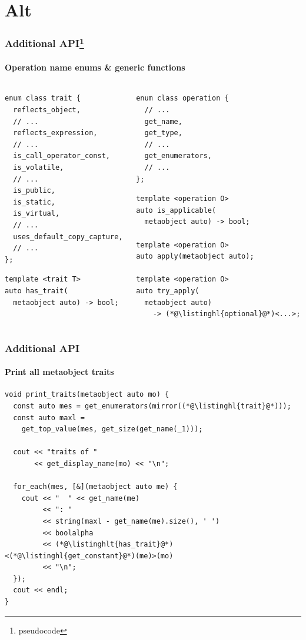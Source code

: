 \documentclass[compress,table,xcolor=table]{beamer}
\begin{document}
\section{Alt}
\begin{frame}[fragile]
  \frametitle{Additional API\footnote{pseudocode}}
  \framesubtitle{Operation name enums \& generic functions}
  \begin{columns}
    \begin{column}{.50\textwidth}
      \begin{lstlisting}[language=c++2x,basicstyle=\scriptsize\ttfamily]
enum class trait {
  reflects_object,
  // ...
  reflects_expression,
  // ...
  is_call_operator_const,
  is_volatile,
  // ...
  is_public,
  is_static,
  is_virtual,
  // ...
  uses_default_copy_capture,
  // ...
};
      \end{lstlisting}
      \vfill
      \begin{lstlisting}[language=c++2x,basicstyle=\scriptsize\ttfamily]
template <trait T>
auto has_trait(
  metaobject auto) -> bool;
      \end{lstlisting}
    \end{column}
    \begin{column}{.50\textwidth}
      \begin{lstlisting}[language=c++2x,basicstyle=\scriptsize\ttfamily]
enum class operation {
  // ...
  get_name,
  get_type,
  // ...
  get_enumerators,
  // ...
};
      \end{lstlisting}
      \begin{lstlisting}[language=c++2x,basicstyle=\scriptsize\ttfamily]
template <operation O>
auto is_applicable(
  metaobject auto) -> bool;

template <operation O>
auto apply(metaobject auto);

template <operation O>
auto try_apply(
  metaobject auto)
    -> (*@\listinghl{optional}@*)<...>;
      \end{lstlisting}
    \end{column}
  \end{columns}
\end{frame}
\begin{frame}[fragile]
  \frametitle{Additional API}
  \framesubtitle{Print all metaobject traits}
  \begin{lstlisting}[language=c++2x,basicstyle=\footnotesize\ttfamily]
void print_traits(metaobject auto mo) {
  const auto mes = get_enumerators(mirror((*@\listinghl{trait}@*)));
  const auto maxl =
    get_top_value(mes, get_size(get_name(_1)));

  cout << "traits of "
       << get_display_name(mo) << "\n";

  for_each(mes, [&](metaobject auto me) {
    cout << "  " << get_name(me)
         << ": "
         << string(maxl - get_name(me).size(), ' ')
         << boolalpha
         << (*@\listinghlt{has_trait}@*)<(*@\listinghl{get_constant}@*)(me)>(mo)
         << "\n";
  });
  cout << endl;
}
  \end{lstlisting}
\end{frame}
\end{document}
